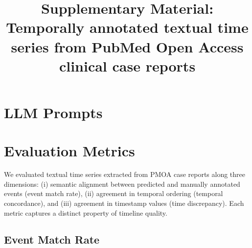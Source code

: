 \documentclass[pdflatex,sn-mathphys-num]{sn-jnl}%
\theoremstyle{thmstyleone}%
\theoremstyle{thmstyletwo}%
\theoremstyle{thmstylethree}%
\begin{document}
\title[Article Title]{Supplementary Material: Temporally annotated textual time series from PubMed Open Access clinical case reports}


\maketitle





\section{LLM Prompts}
\label{apd:llm-prompts}







\section{Evaluation Metrics}
\label{apd:evaluation-metrics}

We evaluated textual time series extracted from PMOA case reports along three dimensions:
(i) semantic alignment between predicted and manually annotated events (event match rate),
(ii) agreement in temporal ordering (temporal concordance), and
(iii) agreement in timestamp values (time discrepancy).  
Each metric captures a distinct property of timeline quality.

\subsection{Event Match Rate}
\label{apd:event-match-rate}
\end{document}
